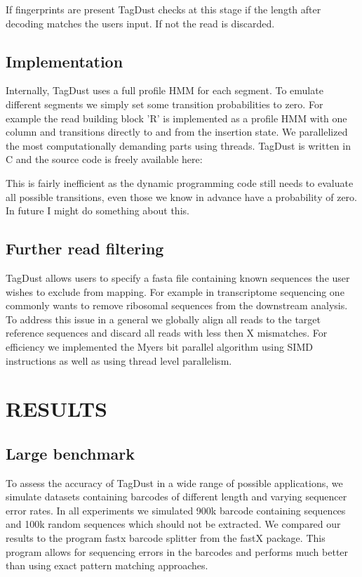 \documentclass[a4,center,fleqn]{NAR}
\begin{document}
If fingerprints are present TagDust checks at this stage if the length after decoding matches the users input. If not the read is discarded. 


\subsection{Implementation} 

Internally, TagDust uses a full profile HMM for each segment. To emulate different segments we simply set some transition probabilities to zero. For example the read building block 'R' is implemented as a profile HMM with one column and transitions directly to and from the insertion state. We parallelized the most computationally demanding parts using threads. TagDust is written in C and the source code is freely available here: 

This is fairly inefficient as the dynamic programming code still needs to evaluate all possible transitions, even those we know in advance have a probability of zero. In future I might do something about this. 

\subsection{Further read filtering}

TagDust allows users to specify a fasta file containing known sequences the user wishes to exclude from mapping. For example in transcriptome sequencing one commonly wants to remove ribosomal sequences from the downstream analysis. To address this issue in a general we globally align all reads to the target reference sequences and discard all reads with less then X mismatches. For efficiency we implemented the Myers bit parallel algorithm using SIMD instructions as well as using thread level parallelism. 

\section{RESULTS}

\subsection{Large benchmark}

To assess the accuracy of TagDust in a wide range of possible applications, we simulate datasets containing barcodes of different length and varying sequencer error rates. In all experiments we simulated 900k barcode containing sequences and 100k random sequences which should not be extracted. We compared our results to the program fastx barcode splitter from the fastX package. This program allows for sequencing errors in the barcodes and performs much better than using exact pattern matching approaches. 
\end{document}

